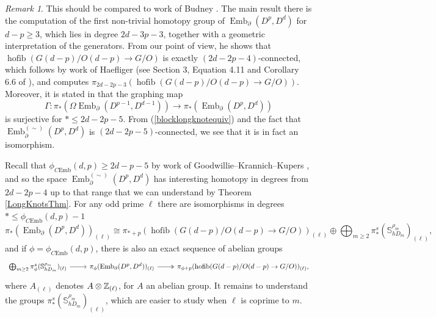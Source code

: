 \documentclass[a4paper, oneside]{amsart}
\newcommand{\emb}{\operatorname{Emb}}
\newcommand{\hofib}{\operatorname{hofib}}
\newcommand{\cemb}{C\mathrm{Emb}}
\newcommand{\1}{\mathds{1}}
\theoremstyle{remark}
\newtheorem{rem}[thm]{Remark}%
\theoremstyle{definition}
\newcommand{\Z}{{\scaleobj{0.97}{\mathbb{Z}}}}
\newcommand{\s}{\mathbb{S}}
\numberwithin{equation}{section}
\begin{document}
\begin{rem}
This should be compared to work of Budney \cite[Prop. 3.9]{BudneyIntegralLongKnots}. The main result there is the computation of the first non-trivial homotopy group of $\emb_\partial(D^p,D^d)$ for $d-p\geq 3$, which lies in degree $2d-3p-3$, together with a geometric interpretation of the generators. From our point of view, he shows that $\hofib(G(d-p)/O(d-p)\to G/O)$ is exactly $(2d-2p-4)$-connected, which follows by work of Haefliger (see Section 3, Equation 4.11 and Corollary 6.6 of \cite{Haefliger}), and computes $\pi_{2d-2p-3}(\hofib(G(d-p)/O(d-p)\to G/O))$. Moreover, it is stated in \cite[Prop. 3.9(1)]{BudneyIntegralLongKnots} that the graphing map
$$
\Gamma: \pi_*(\Omega\emb_\partial(D^{p-1},D^{d-1}))\longrightarrow \pi_*(\emb_\partial(D^p,D^d))
$$
is surjective for $*\leq 2d-2p-5$. From (\ref{blocklongknotequiv}) and the fact that $\emb^{(\sim)}_\partial(D^p,D^d)$ is $(2d-2p-5)$-connected, we see that it is in fact an isomorphism.
\end{rem}

Recall that $\phi_{\cemb}(d,p)\geq 2d-p-5$ by work of Goodwillie--Krannich--Kupers \cite{ConcEmbStablerange}, and so the space $\emb^{(\sim)}_\partial(D^p,D^d)$ has interesting homotopy in degrees from $2d-2p-4$ up to that range that we can understand by Theorem \ref{LongKnotsThm}. For any odd prime $\ell$ there are isomorphisms in degrees $*\leq \phi_{\cemb}(d,p)-1$
$$
\pi_*(\emb_\partial(D^p,D^d))_{(\ell)}\cong \pi_{*+p}(\hofib(G(d-p)/O(d-p)\to G/O))_{(\ell)}\oplus\bigoplus_{m\geq 2}\pi_*^s(\s^{\rho_m}_{hD_m})_{(\ell)},
$$
and if $\phi=\phi_{\cemb}(d,p)$, there is also an exact sequence of abelian groups
$$
\begin{tikzcd}
    \bigoplus_{m\geq 2}\pi_{\phi}^s(\s^{\rho_m}_{hD_m})_{(\ell)}\rar &\pi_\phi(\emb_\partial(D^p,D^d))_{(\ell)}\rar[two heads] & \pi_{\phi+p}(\hofib(G(d-p)/O(d-p)\to G/O))_{(\ell)},
\end{tikzcd}
$$
where $A_{(\ell)}$ denotes $A\otimes \Z_{(\ell)}$, for $A$ an abelian group. It remains to understand the groups $\pi_*^s(\s^{\rho_m}_{hD_m})_{(\ell)}$, which are easier to study when $\ell$ is coprime to $m$. 
\end{document}
